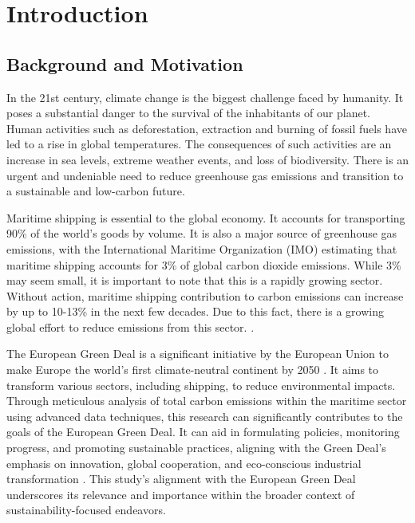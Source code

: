 \chapter{Introduction}
\setcounter{page}{1}

\section{Background and Motivation}

In the 21st century, climate change is the biggest challenge faced by humanity.
It poses a substantial danger to the survival of the inhabitants of our planet.
Human activities such as deforestation, extraction and burning of fossil fuels have led to a rise in global temperatures.
The consequences of such activities are an increase in sea levels, extreme weather events, and loss of biodiversity.
There is an urgent and undeniable need to reduce greenhouse gas emissions and transition to a sustainable and low-carbon future.

Maritime shipping is essential to the global economy.
It accounts for transporting 90\% of the world's goods by volume.
It is also a major source of greenhouse gas emissions,
with the International Maritime Organization (IMO) estimating that maritime shipping accounts for 3\% of global carbon dioxide emissions.
While 3\% may seem small, it is important to note that this is a rapidly growing sector.
Without action, maritime shipping contribution to carbon emissions can increase by up to 10-13\% in the next few decades.
Due to this fact, there is a growing global effort to reduce emissions from this sector. \autocite{king_anthony_2022}.

The European Green Deal is a significant initiative by the European Union to make Europe the world's first climate-neutral continent by 2050 .
It aims to transform various sectors, including shipping, to reduce environmental impacts.
Through meticulous analysis of total carbon emissions within the maritime sector using advanced data techniques,
this research can significantly contributes to the goals of the European Green Deal. It can aid in formulating policies, monitoring progress, and promoting sustainable practices,
aligning with the Green Deal's emphasis on innovation, global cooperation, and eco-conscious industrial transformation \autocite{siddi2020european}.
This study's alignment with the European Green Deal underscores its relevance and importance within the broader context of sustainability-focused endeavors.

